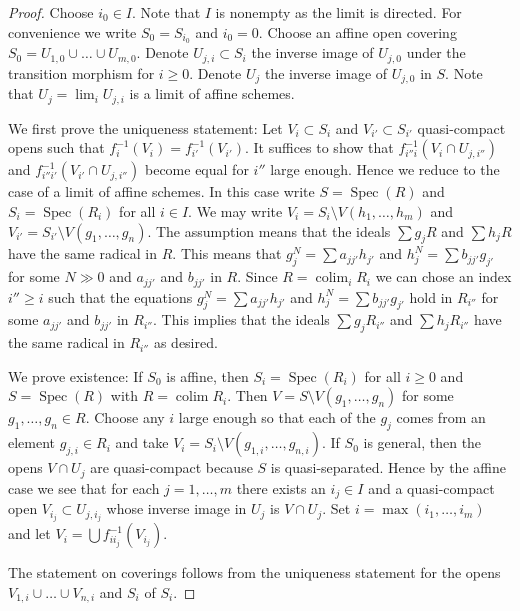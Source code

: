 \documentclass{amsart}
\theoremstyle{plain}
\theoremstyle{definition}
\theoremstyle{remark}
\numberwithin{equation}{subsection}
\def\lim{\mathop{\mathrm{lim}}\nolimits}
\def\colim{\mathop{\mathrm{colim}}\nolimits}
\def\Spec{\mathop{\mathrm{Spec}}}
\begin{document}
\begin{proof}
Choose $i_0 \in I$. Note that $I$ is nonempty as the limit is directed.
For convenience we write $S_0 = S_{i_0}$ and $i_0 = 0$.
Choose an affine open covering $S_0 = U_{1, 0} \cup \ldots \cup U_{m, 0}$.
Denote $U_{j, i} \subset S_i$ the inverse image of $U_{j, 0}$
under the transition morphism for $i \geq 0$.
Denote $U_j$ the inverse image of $U_{j, 0}$ in $S$.
Note that $U_j = \lim_i U_{j, i}$ is a limit of affine
schemes.

\medskip\noindent
We first prove the uniqueness statement: Let
$V_i \subset S_i$ and $V_{i'} \subset S_{i'}$
quasi-compact opens such that $f_i^{-1}(V_i) = f_{i'}^{-1}(V_{i'})$.
It suffices to show that $f_{i''i}^{-1}(V_i \cap U_{j, i''})$ and
$f_{i''i'}^{-1}(V_{i'} \cap U_{j, i''})$ become equal
for $i''$ large enough. Hence we reduce to the case
of a limit of affine schemes. In this case write
$S = \Spec(R)$ and $S_i = \Spec(R_i)$ for all $i \in I$.
We may write $V_i = S_i \setminus V(h_1, \ldots, h_m)$
and $V_{i'} = S_{i'} \setminus V(g_1, \ldots, g_n)$.
The assumption means that the ideals
$\sum g_jR$ and $\sum h_jR$ have the same radical
in $R$. This means that $g_j^N = \sum a_{jj'}h_{j'}$ and
$h_j^N = \sum b_{jj'} g_{j'}$ for some $N \gg 0$ and $a_{jj'}$
and $b_{jj'}$ in $R$.
Since $R = \colim_i R_i$ we can chose an index
$i'' \geq i$ such that the equations
$g_j^N = \sum a_{jj'}h_{j'}$ and
$h_j^N = \sum b_{jj'} g_{j'}$ hold in $R_{i''}$ for some
$a_{jj'}$ and $b_{jj'}$ in $R_{i''}$. This implies that
the ideals $\sum g_jR_{i''}$ and $\sum h_jR_{i''}$ have the same radical
in $R_{i''}$ as desired.

\medskip\noindent
We prove existence: If $S_0$ is affine, then $S_i = \Spec(R_i)$ for all
$i \geq 0$ and $S = \Spec(R)$ with $R = \colim R_i$. Then
$V = S \setminus V(g_1, \ldots, g_n)$ for some $g_1, \ldots, g_n \in R$.
Choose any $i$ large enough so that each of the $g_j$ comes from an
element $g_{j, i} \in R_i$ and take
$V_i = S_i \setminus V(g_{1, i}, \ldots, g_{n, i})$.
If $S_0$ is general, then the opens $V \cap U_j$
are quasi-compact because $S$ is quasi-separated. Hence by the
affine case we see that for each $j = 1, \ldots, m$
there exists an $i_j \in I$ and a quasi-compact open
$V_{i_j} \subset U_{j, i_j}$ whose inverse image in $U_j$
is $V \cap U_j$. Set $i = \max(i_1, \ldots, i_m)$
and let $V_i = \bigcup f_{ii_j}^{-1}(V_{i_j})$.

\medskip\noindent
The statement on coverings follows from the uniqueness statement
for the opens $V_{1, i} \cup \ldots \cup V_{n, i}$ and $S_i$ of $S_i$.
\end{proof}
\end{document}
